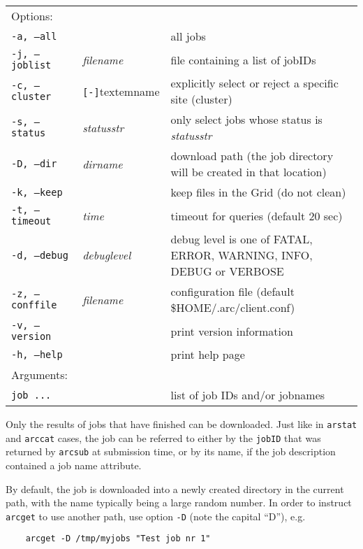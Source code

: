 \hspace*{0.5cm}
\begin{shaded}
\end{shaded}
\begin{longtable}{llp{8cm}}
   Options:&&\\
   \texttt{-a, --all}& & all jobs\\
   \texttt{-j, --joblist}& \textit{filename} & file containing a list of jobIDs\\
   \texttt{-c, --cluster}&\verb#[-]#textem{name}&explicitly select or reject a specific site (cluster)\\
   \texttt{-s, --status}& \textit{statusstr} &only select jobs whose status is \textit{statusstr}\\
   \texttt{-D, --dir} & \textit{dirname} & download path (the job directory will be created in that location)\\
   \texttt{-k, --keep}& & keep files in the Grid (do not clean)\\
   \texttt{-t, --timeout}& \textit{time} & timeout for queries (default 20 sec)\\
   \texttt{-d, --debug}& \textit{debuglevel}&debug level is one of  FATAL, ERROR, WARNING, INFO, DEBUG or VERBOSE\\
   \texttt{-z, --conffile}&\textit{filename}& configuration file (default {\$}HOME/.arc/client.conf)\\
   \texttt{-v, --version}& & print version information\\
   \texttt{-h, --help}& & print help page\\
   Arguments:&&\\
   \texttt{job ...} && list of job IDs and/or jobnames\\
\end{longtable}

Only the results of jobs that have finished can be downloaded. Just like in \verb#arstat# 
and \verb#arccat# cases, the job can be referred to either by the \texttt{jobID} that was returned by
\texttt{arcsub} at submission time, or by its name, if the job
description contained a job name attribute.

By default, the job is downloaded into a newly created directory in the current path, with the
name typically being a large random number. In order to instruct \verb#arcget# to use another
path, use option \verb#-D# (note the capital ``D''), e.g.
\begin{verbatim}
    arcget -D /tmp/myjobs "Test job nr 1"
\end{verbatim}

